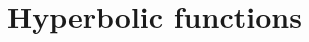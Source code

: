 \documentclass[preview]{standalone}
\begin{document}
\genpage

\section{Hyperbolic functions}
\end{document}
